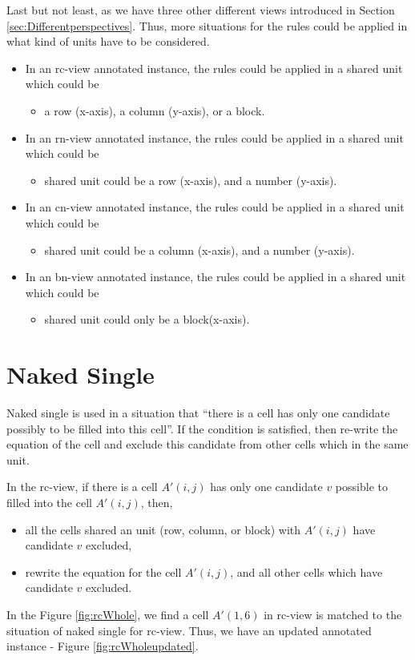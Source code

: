 \documentclass[11pt]{report}
\begin{document}
Last but not least, as we have three other different views introduced in Section \ref{sec:Differentperspectives}. Thus, more situations for the rules could be applied in what kind of units have to be considered.
\begin{itemize}
\item In an rc-view annotated instance, the rules could be applied in a shared unit which could be
\begin{itemize}
\item a row (x-axis), a column (y-axis), or a block.
\end{itemize}
\item In an rn-view annotated instance, the rules could be applied in a shared unit which could be
\begin{itemize}
\item shared unit could be a row (x-axis), and a number (y-axis).
\end{itemize}
\item In an cn-view annotated instance, the rules could be applied in a shared unit which could be
\begin{itemize}
\item shared unit could be a column (x-axis), and a number (y-axis).
\end{itemize}
\item In an bn-view annotated instance, the rules could be applied in a shared unit which could be
\begin{itemize}
\item shared unit could only be a block(x-axis).
\end{itemize}
\end{itemize}

\section{Naked Single}
\label{sec:Nakedsingle}

Naked single is used in a situation that ``there is a cell has only one candidate possibly to be filled into this cell''. If the condition is satisfied, then re-write the equation of the cell and exclude this candidate from other cells which in the same unit.

In the rc-view, if there is a cell $A'(i,j)$ has only one candidate $v$ possible to filled into the cell $A'(i,j)$, then,
\begin{itemize}
\item all the cells shared an unit (row, column, or block) with $A'(i,j)$ have candidate $v$ excluded,
\item rewrite the equation for the cell $A'(i,j)$, and all other cells which have candidate $v$ excluded.
\end{itemize}
In the Figure \ref{fig:rcWhole}, we find a cell $A'(1,6)$ in rc-view is matched to the situation of naked single for rc-view. Thus, we have an updated annotated instance - Figure \ref{fig:rcWholeupdated}.
\end{document}
